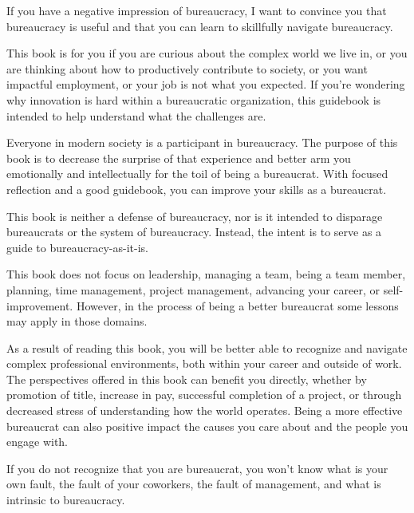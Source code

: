 

If you have a negative impression of bureaucracy, I want to convince you that bureaucracy is useful and that you can learn to skillfully navigate bureaucracy.


This book is for you if you are curious about the complex world we live in, or you are thinking about how to productively contribute to society, or you want impactful employment, or your job is not what you expected. If you're wondering why innovation is hard within a bureaucratic organization, this guidebook is intended to help understand what the challenges are.


Everyone in modern society is a participant in bureaucracy. The purpose of this book is to decrease the surprise of that experience and better arm you emotionally and intellectually for the toil of being a bureaucrat. With focused reflection and a good guidebook, you can improve your skills as a bureaucrat. 

This book is neither a defense of bureaucracy, nor is it intended to disparage bureaucrats or the system of bureaucracy. Instead, the intent is to serve as a guide to bureaucracy-as-it-is. 

This book does not focus on leadership, managing a team, being a team member, planning, time management, project management, advancing your career, or self-improvement. However, in the process of being a better bureaucrat some lessons may apply in those domains.


As a result of reading this book, you will be better able to recognize and navigate complex professional environments, both within your career and outside of work. The perspectives offered in this book can benefit you directly, whether by promotion of title, increase in pay, successful completion of a project, or through decreased stress of understanding how the world operates. Being a more effective bureaucrat can also positive impact the causes you care about and the people you engage with.

If you do not recognize that you are bureaucrat, you won't know what is your own fault, the fault of your coworkers, the fault of management, and what is intrinsic to bureaucracy. 

